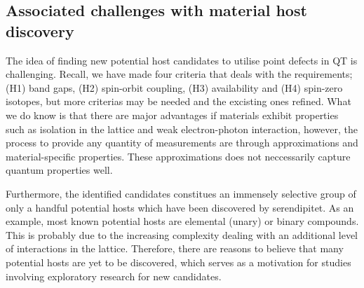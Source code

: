 \subsection{Associated challenges with material host discovery}

The idea of finding new potential host candidates to utilise point defects in QT is challenging. Recall, we have made four criteria that deals with the requirements; (H1) band gaps, (H2) spin-orbit coupling, (H3) availability and (H4) spin-zero isotopes, but more criterias may be needed and the excisting ones refined.%
What we do know is that there are major advantages if materials exhibit properties such as isolation in the lattice and weak electron-photon interaction, however, the process to provide any quantity of measurements are through approximations and material-specific properties. These approximations does not neccessarily capture quantum properties well.

Furthermore, the identified candidates constitues an immensely selective group of only a handful potential hosts which have been discovered by serendipitet. As an example, most known potential hosts are elemental (unary) or binary compounds. This is probably due to the increasing complexity dealing with an additional level of interactions in the lattice. Therefore, there are reasons to believe that many potential hosts are yet to be discovered, which serves as a motivation for studies involving exploratory research for new candidates.






\clearpage
